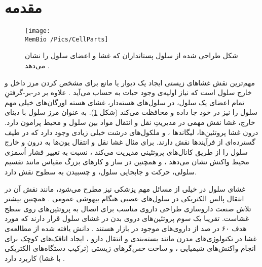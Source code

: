 \setRL


\section{
مقدمه
}
\begin{figure}[h]
\begin{center}
\texttt{[image: \\MemBio /Pics/CellParts]}
\caption{
شکل طراحی شده از سلول پستانداران که غشا و اعضای سلول را نشان می‌دهد
\cite{CellParts}.
}
\label{fig:cellparts}
\end{center}
\end{figure}

مهم‌ترین نقش غشاهای زیستی ایجاد یک دیوار یا مانع برای مشخص کردن مرز داخل و خارج سلول است که نیاز اولیه‌ی وجود حیات به حساب می‌آید
\cite{Boyle2008Biology}.
 علاوه بر در-بر-گرفتنِ تمام اعضای یک سلول، در سلول‌های هسته‌دار، غشای هسته اورگان‌های خیلی مهم سلول را نیز در خود جا داده و محافظت می‌کند (شکل
\ref{fig:cellparts}). به عنوان مرز سلول با دینای خارج، غشا نقش مهمی در مدیریتِ نقل و انتقال مواد بین سلول و محیط پرامون دارد. درون غشا پروتئین‌ها، لیگاند‌ها
،
و ملکول‌های درشت خیلی زیادی وجود دارد که در طیف‌ گسترده‌ای از فرآیندها نقش دارند. برای مثال غشا نقل و انتقال یون‌ها به درون و خارج سلول را از طریق کانال‌های پروتئینی مدیریت می‌کند
\cite{NEHER1976ProteinChannel}،
نسبت به تغییر فشار اُسمزی محیط واکنش نشان می‌دهد
\cite{Perozo2006Osmotic,Vasquez2009Osmotic,Haswell2011Osmotic}،
و همچنین در ساز و کار‌های بزرگ مقیاس مانند تقسیم سلولی، حرکت و جابجایی سلول، و چسبیدن به سطوح نقش دارد.


غشای سلول در خیلی از مسائل مهم پزشکی نیز مطرح می‌شود، مانند نقش آن در انتقال پالس الکتریکی در سلول‌های عصبی هنگام بیهوشی عمومی 
\cite{BioMemBook2007}.
همچنین بیشتر تلاش صنعت داروسازی طراحی داروی مناسب برای اتصال به پروتئین‌های روی سطح غشاست. تقریبا یک سوم پروتئین‌های دروی بدن در غشای سلول قرار دارند که  مورد هدف ۶۰ در صد از داروی‌های موجود در بازار هستند
\cite{DrugDelivery2007}.
 دانش یافته شده از مطالعه‌ی غشا در تکنولوژی‌های مدرن مانند بسته‌بندی و انتقال دارو
\cite{Torchilin2006Drugdelivery}،
ایجاد اتاقک‌های کوچک برای انجام واکنش‌های شیمیایی
\cite{Karlsson2001MemChamber}،
 و ساخت حس‌گرهای زیستی (ترکیب دستگاه‌های الکتریکی با غشا) کاربرد دارد
\cite{MemeElctronics2012}.
